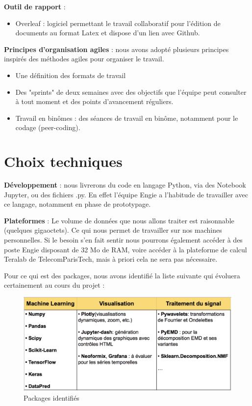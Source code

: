 \textbf{Outil de rapport} :
\begin{itemize}
\item Overleaf : logiciel permettant le travail collaboratif pour l'édition de documents au format Latex et dispose d'un lien avec Github.
\end{itemize}

\textbf{Principes d'organisation agiles} : nous avons adopté plusieurs principes inspirés des méthodes agiles pour organiser le travail.
\begin{itemize}
\item Une définition des formats de travail
\item Des "sprints" de deux semaines avec des objectifs que l'équipe peut consulter à tout moment et des points d’avancement réguliers.
\item Travail en binômes : des séances de travail en binôme, notamment pour le codage (peer-coding).
\end{itemize}

\section{Choix techniques}
\textbf{Développement} : nous livrerons du code en langage Python, via des Notebook Jupyter, ou des fichiers .py. En effet l'équipe Engie a l'habitude de travailler avec ce langage, notamment en phase de prototypage.

\textbf{Plateformes} : Le volume de données que nous allons traiter est raisonnable (quelques gigaoctets). Ce qui nous permet de travailler sur nos machines personnelles. Si le besoin s'en fait sentir nous pourrons également accéder à des poste Engie disposant de 32 Mo de RAM, voire accéder à la plateforme de calcul Teralab de TelecomParisTech, mais à priori cela ne sera pas nécessaire.

Pour ce qui est des packages, nous avons identifié la liste suivante qui évoluera certainement au cours du projet :

\begin{figure}[!ht]
\begin{center}
\includegraphics[scale=0.6]{rapport/images/Ch2_Packages.png}
\end{center}
\caption{Packages identifiés}
\end{figure}

